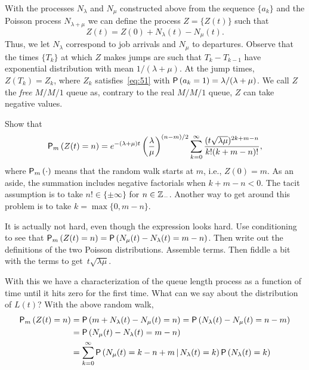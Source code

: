With the processes $N_\lambda$ and $N_\mu$ constructed above from the sequence $\{a_k\}$ and the Poisson process $N_{\lambda+\mu}$ we can define the process $Z=\{Z(t)\}$ such that
\begin{equation*}
  Z(t) = Z(0)+N_\lambda(t) - N_\mu(t).
\end{equation*}
Thus, we let $N_\lambda$ correspond to job  arrivals and $N_\mu$ to departures. Observe that the times $\{T_k\}$ at which $Z$ makes jumps are such that $T_k-T_{k-1}$ have exponential distribution with mean $1/(\lambda+\mu)$. At the jump times, $Z(T_k) = Z_k$, where $Z_k$ satisfies~\cref{eq:51} with $\P{a_k = 1} = \lambda/(\lambda+\mu)$.  We call $Z$ the \emph{free} $M/M/1$ queue as, contrary to the real $M/M/1$ queue, $Z$ can take negative values. 

\begin{exercise}
  Show that
\begin{equation*}
    \P{Z(t)=n}_m 
= e^{-(\lambda+\mu)t} \left(\frac\lambda\mu\right)^{(n-m)/2} \sum_{k=0}^\infty 
\frac{(t\sqrt{\lambda\mu} )^{2k+m-n}}{k!(k+m-n)!},
\end{equation*}
where $\P{\cdot}_m$ means that the random walk starts at $m$, i.e., $Z(0)=m$.
As an aside, the summation includes negative factorials when $k+m-n<0$.
The tacit assumption is to take $n!\in \{\pm \infty\}$ for $n\in \mathbb{Z}_-$.
Another way to get around this problem is to take $k=\max\{0, m-n\}$.
\begin{hint}
It is actually not hard, even though the expression looks
  hard. Use conditioning to see that
  $\P{Z(t)=n}_m = \P{N_\mu(t) - N_\lambda(t) = m - n}$. Then write out
  the definitions of the two Poisson distributions. Assemble
  terms. Then fiddle a bit with the terms to get~$t\sqrt{\lambda\mu}$. 
\end{hint}
\begin{solution}
With this we have a characterization of the queue length process as a
function of time until it hits zero for the first time. What can we
say about the distribution of $L(t)$? With the above random walk, 
\begin{equation}\label{eq:29}
  \begin{split}
    \P{Z(t)=n}_m
&= \P{m+N_\lambda(t) - N_\mu(t) = n }  = \P{N_\lambda(t) - N_\mu(t) = n-m }  \\
&= \P{N_\mu(t) - N_\lambda(t) = m-n }  \\
&= \sum_{k=0}^\infty \P{N_\mu(t) = k - n + m\given N_\lambda(t) = k } \P{N_\lambda(t)=k}\\

\end{split}
\end{equation}
\end{solution}
\end{exercise}
